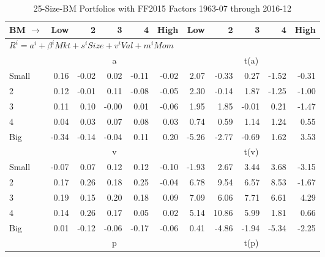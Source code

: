 
\begin{table}[!ht]
\centering
\caption{25-Size-BM Portfolios with FF2015 Factors 1963-07 through 2016-12}
\begin{tabular}{lrrrrrrrrrr}
  \toprule
    BM $\rightarrow$ & Low & 2 & 3 & 4 & High & Low & 2 & 3 & 4 & High \\ 
  \midrule
  \multicolumn{11}{l}{$R^i=a^i+\beta^iMkt+s^iSize+v^iVal+m^iMom$} \\

  
    
      & \multicolumn{5}{c}{a} & \multicolumn{5}{c}{t(a)}
    
    \\
      \cmidrule(r){2-6} \cmidrule(r){7-11}

    Small   & 0.16  & -0.02  & 0.02  & -0.11  & -0.02  & 2.07  & -0.33  & 0.27  & -1.52  & -0.31  \\
         2  & 0.12  & -0.01  & 0.11  & -0.08  & -0.05  & 2.30  & -0.14  & 1.87  & -1.25  & -1.00  \\
         3  & 0.11  & 0.10  & -0.00  & 0.01  & -0.06  & 1.95  & 1.85  & -0.01  & 0.21  & -1.47  \\
         4  & 0.04  & 0.03  & 0.07  & 0.08  & 0.03  & 0.74  & 0.59  & 1.14  & 1.24  & 0.55  \\
    Big     & -0.34  & -0.14  & -0.04  & 0.11  & 0.20  & -5.26  & -2.77  & -0.69  & 1.62  & 3.53  \\

  
    
      & \multicolumn{5}{c}{v} & \multicolumn{5}{c}{t(v)}
    
    \\
      \cmidrule(r){2-6} \cmidrule(r){7-11}

    Small   & -0.07  & 0.07  & 0.12  & 0.12  & -0.10  & -1.93  & 2.67  & 3.44  & 3.68  & -3.15  \\
         2  & 0.17  & 0.26  & 0.18  & 0.25  & -0.04  & 6.78  & 9.54  & 6.57  & 8.53  & -1.67  \\
         3  & 0.19  & 0.15  & 0.20  & 0.18  & 0.09  & 7.09  & 6.06  & 7.71  & 6.61  & 4.29  \\
         4  & 0.14  & 0.26  & 0.17  & 0.05  & 0.02  & 5.14  & 10.86  & 5.99  & 1.81  & 0.66  \\
    Big     & 0.01  & -0.12  & -0.06  & -0.17  & -0.06  & 0.41  & -4.86  & -1.94  & -5.34  & -2.25  \\

  
    
      & \multicolumn{5}{c}{p} & \multicolumn{5}{c}{t(p)}
    

\end{tabular}
\end{table}
